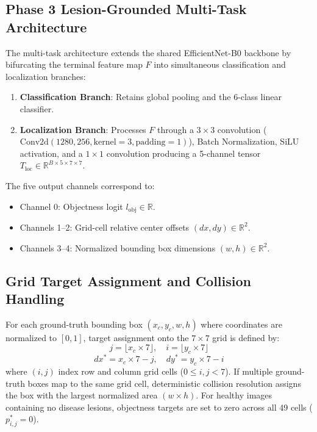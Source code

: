 \subsection{Phase 3 Lesion-Grounded Multi-Task Architecture}
The multi-task architecture extends the shared EfficientNet-B0 backbone by bifurcating the terminal feature map $F$ into simultaneous classification and localization branches:
\begin{enumerate}
    \item \textbf{Classification Branch}: Retains global pooling and the 6-class linear classifier.
    \item \textbf{Localization Branch}: Processes $F$ through a $3\times 3$ convolution ($\text{Conv2d}(1280, 256, \text{kernel}=3, \text{padding}=1)$), Batch Normalization, SiLU activation, and a $1\times 1$ convolution producing a 5-channel tensor $T_{\text{loc}} \in \mathbb{R}^{B \times 5 \times 7 \times 7}$.
\end{enumerate}

The five output channels correspond to:
\begin{itemize}
    \item Channel 0: Objectness logit $l_{\text{obj}} \in \mathbb{R}$.
    \item Channels 1--2: Grid-cell relative center offsets $(dx, dy) \in \mathbb{R}^2$.
    \item Channels 3--4: Normalized bounding box dimensions $(w, h) \in \mathbb{R}^2$.
\end{itemize}

\subsection{Grid Target Assignment and Collision Handling}
For each ground-truth bounding box $(x_c, y_c, w, h)$ where coordinates are normalized to $[0, 1]$, target assignment onto the $7\times 7$ grid is defined by:
\begin{equation}
j = \lfloor x_c \times 7 \rfloor, \quad i = \lfloor y_c \times 7 \rfloor
\end{equation}
\begin{equation}
dx^* = x_c \times 7 - j, \quad dy^* = y_c \times 7 - i
\end{equation}
where $(i, j)$ index row and column grid cells ($0 \le i, j < 7$). If multiple ground-truth boxes map to the same grid cell, deterministic collision resolution assigns the box with the largest normalized area $(w \times h)$. For healthy images containing no disease lesions, objectness targets are set to zero across all 49 cells ($p_{i,j}^* = 0$).

